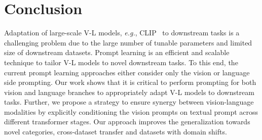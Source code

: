 \documentclass[10pt,twocolumn,letterpaper]{article}
\newcommand{\tablestyle}[2]{\setlength{\tabcolsep}{#1}\renewcommand{\arraystretch}{#2}\centering\footnotesize}
\def\eg{\emph{e.g.}\xspace}
\begin{document}
\begin{table}[!h]
\tablestyle{8pt}{1.1}
\addtolength{\tabcolsep}{-3.7pt}
\caption[caption]{{Comparison of computational complexity among different prompting methods. MaPLe\dag~ is a MaPLe version which utilizes a common V-L coupling function for all layers.}
\label{tab:computationalcomparison}
}
\vspace{-0.15in}
\end{table}

\section{Conclusion}
\noindent Adaptation of large-scale V-L models, \eg, CLIP~\cite{radford2021learning} to downstream tasks is a challenging problem due to the large number of tunable parameters and limited size of downstream datasets. Prompt learning is an efficient and scalable technique to tailor V-L models to novel downstream tasks. To this end, the current prompt learning approaches either consider only the vision or language side prompting.  Our work shows that it is critical to perform prompting for both vision and language branches to appropriately adapt V-L models to downstream tasks. Further, we propose a strategy to ensure synergy between vision-language modalities by explicitly conditioning the vision prompts on textual prompt across different transformer stages.  Our approach improves the generalization towards novel categories, cross-dataset transfer and datasets with domain shifts.
\end{document}

